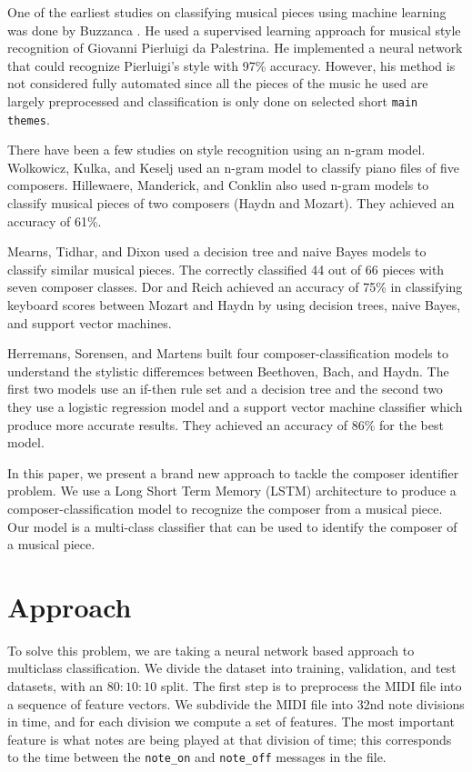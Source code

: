 \documentclass[11pt,a4paper]{article}
\begin{document}
One of the earliest studies on classifying musical pieces using machine learning was done by Buzzanca \cite{Buzz}. He used a supervised learning approach for musical style recognition of Giovanni Pierluigi da Palestrina. He implemented a neural network that could recognize Pierluigi's style with 97\% accuracy. However, his method is not considered fully automated since all the pieces of the music he used are largely preprocessed and classification is only done on selected short \texttt {main themes}.

There have been a few studies on style recognition using an n-gram model. Wolkowicz, Kulka, and Keselj \cite{n-gram} used an n-gram model to classify piano files of five composers.  Hillewaere, Manderick, and Conklin \cite{Hillewaere} also used n-gram models to classify musical pieces of two composers (Haydn and Mozart). They achieved an accuracy of 61\%.

Mearns, Tidhar, and Dixon \cite{Mearns} used a decision tree and naive Bayes models to classify similar musical pieces. The correctly classified 44 out of 66 pieces with seven composer classes. Dor and Reich \cite{Dor} achieved an accuracy of 75\% in classifying keyboard scores between Mozart and Haydn by using decision trees, naive Bayes, and support vector machines.

Herremans, Sorensen, and Martens \cite {Herremans} built four composer-classification models to understand the stylistic differemces between Beethoven, Bach, and Haydn. The first two models use an if-then rule set and a decision tree and the second two they use a logistic regression model and a support vector machine classifier which produce more accurate results. They achieved an accuracy of 86\% for the best model. 

In this paper, we present a brand new approach to tackle the composer identifier problem. We use a Long Short Term Memory (LSTM) architecture to produce a composer-classification model to recognize the composer from a musical piece. Our model is a multi-class classifier that can be used to identify the composer of a musical piece. 


\section{Approach}
To solve this problem, we are taking a neural network based approach to multiclass classification. We divide the dataset into training, validation, and test datasets, with an $80:10:10$ split. The first step is to preprocess the MIDI file into a sequence of feature vectors. We subdivide the MIDI file into 32nd note divisions in time, and for each division we compute a set of features. The most important feature is what notes are being played at that division of time; this corresponds to the time between the \texttt{note\_on}  and \texttt{note\_off}  messages in the file. 
\end{document}
